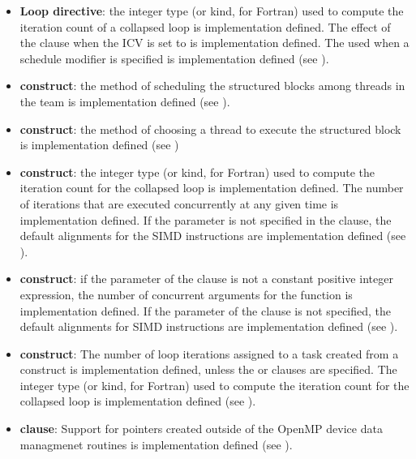\begin{itemize}
\item \textbf{Loop directive}: the integer type (or kind, for Fortran) used to compute the iteration 
count of a collapsed loop is implementation defined. The effect of the 
 clause when the  ICV is set to  is 
implementation defined. The  used when a 
schedule modifier is specified is implementation defined (see ).

\item {} \textbf{construct}: the method of scheduling the structured blocks among threads 
in the team is implementation defined (see ).

\item {} \textbf{construct}: the method of choosing a thread to execute the structured block 
is implementation defined (see )

\item {} \textbf{construct}: the integer type (or kind, for
  Fortran) used to compute the iteration count for the collapsed loop
  is implementation defined. The number of iterations that are
  executed concurrently at any given time is implementation
  defined. If the  parameter is not specified in the
   clause, the default alignments for the SIMD
  instructions are implementation defined (see ).

\item {} \textbf{construct}: if the parameter of the
   clause is not a constant positive integer expression,
  the number of concurrent arguments for the function is
  implementation defined. If the  parameter of the
   clause is not specified, the default alignments for
  SIMD instructions are implementation defined (see
  ).

\item {} \textbf{construct}: The number of loop
  iterations assigned to a task created from a 
  construct is implementation defined, unless the  or
   clauses are specified. The integer type (or kind,
  for Fortran) used to compute the iteration count for the collapsed
  loop is implementation defined (see ).

\item {} \textbf{clause}: 
  Support for pointers created outside of the OpenMP device data managmenet
  routines is implementation defined (see ).


\end{itemize}
